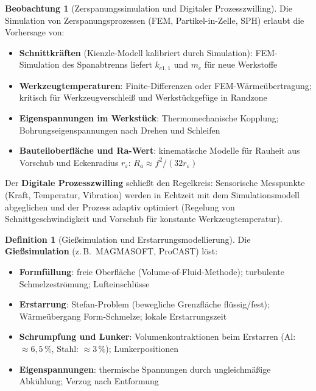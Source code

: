 ﻿\documentclass[a4paper,12pt]{report}
\theoremstyle{definition}
\newtheorem{definition}{Definition}
\newtheorem{beobachtung}{Beobachtung}
\begin{document}
\begin{beobachtung}[Zerspanungssimulation und Digitaler Prozesszwilling]
Die Simulation von Zerspanungsprozessen (FEM, Partikel-in-Zelle, SPH)
erlaubt die Vorhersage von:
\begin{itemize}
    \item[-] \textbf{Schnittkräften} (Kienzle-Modell kalibriert durch Simulation):
          FEM-Simulation des Spanabtrenns liefert $k_{c1,1}$ und $m_c$ für neue Werkstoffe
    \item[-] \textbf{Werkzeugtemperaturen}: Finite-Differenzen oder FEM-Wärmeübertragung;
          kritisch für Werkzeugverschleiß und Werkstückgefüge in Randzone
    \item[-] \textbf{Eigenspannungen im Werkstück}: Thermomechanische Kopplung;
          Bohrungseigenspannungen nach Drehen und Schleifen
    \item[-] \textbf{Bauteiloberfläche und Ra-Wert}: kinematische Modelle
          für Rauheit aus Vorschub und Eckenradius $r_\varepsilon$:
          $R_a \approx f^2/(32 r_\varepsilon)$
\end{itemize}
Der \textbf{Digitale Prozesszwilling} schließt den Regelkreis:
Sensorische Messpunkte (Kraft, Temperatur, Vibration) werden in Echtzeit
mit dem Simulationsmodell abgeglichen und der Prozess adaptiv optimiert
(Regelung von Schnittgeschwindigkeit und Vorschub für konstante Werkzeugtemperatur).
\end{beobachtung}

\begin{definition}[Gießsimulation und Erstarrungsmodellierung]
Die \textbf{Gießsimulation} (z.\,B.\ MAGMASOFT, ProCAST) löst:
\begin{itemize}
    \item[-] \textbf{Formfüllung}: freie Oberfläche (Volume-of-Fluid-Methode);
          turbulente Schmelzeströmung; Lufteinschlüsse
    \item[-] \textbf{Erstarrung}: Stefan-Problem (bewegliche Grenzfläche
          flüssig/fest); Wärmeübergang Form-Schmelze; lokale Erstarrungszeit
    \item[-] \textbf{Schrumpfung und Lunker}: Volumenkontraktionen beim Erstarren
          (Al: $\approx 6{,}5\,\%$, Stahl: $\approx 3\,\%$); Lunkerpositionen
    \item[-] \textbf{Eigenspannungen}: thermische Spannungen durch ungleichmäßige
          Abkühlung; Verzug nach Entformung
\end{itemize}
\end{definition}
\end{document}
